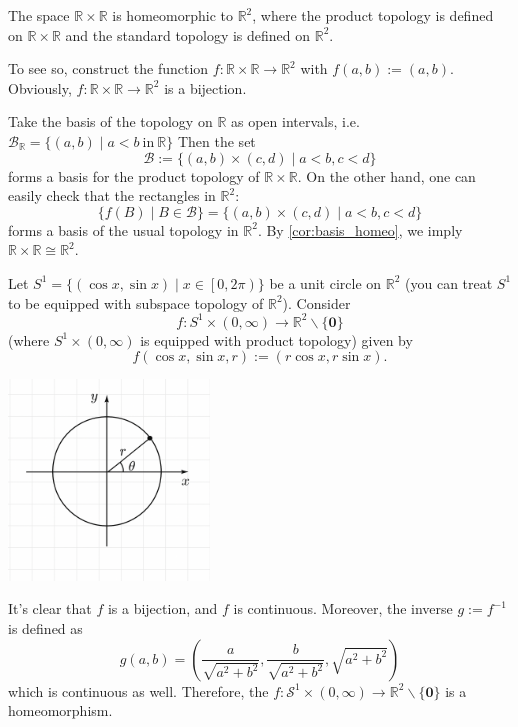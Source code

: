 \begin{example}
The space \(\mathbb{R} \times  \mathbb{R}\) is homeomorphic to \({\mathbb{R}}^{2}\), where the product topology is defined on \(\mathbb{R} \times  \mathbb{R}\) and the standard topology is defined on \({\mathbb{R}}^{2}\). 

To see so, construct the function \(f : \mathbb{R} \times  \mathbb{R} \rightarrow  {\mathbb{R}}^{2}\) with \(f\left({a,b}\right)  :=\left({a,b}\right)\). Obviously, \(f : \mathbb{R} \times  \mathbb{R} \rightarrow  {\mathbb{R}}^{2}\) is a bijection.

Take the basis of the topology on \(\mathbb{R}\) as open intervals, i.e.
\(
\mathcal{B}_{\mathbb{R}} = \{ \left({a,b}\right)  \mid  a < b\ \text{in}\ \mathbb{R}\}
\)
Then the set 
\[\mathcal{B} := \{ \left({a,b}\right)  \times  \left({c,d}\right)  \mid  a < b,c < d\}\] 
forms a basis for the product topology of $\mathbb{R} \times \mathbb{R}$. On the other hand, one can easily check that the rectangles in $\mathbb{R}^2$:
\[
\{ f\left(B\right)  \mid  B \in  \mathcal{B}\}  = \{ \left({a,b}\right)  \times  \left({c,d}\right)  \mid  a < b,c < d\}
\]
forms a basis of the usual topology in \({\mathbb{R}}^{2}\). By \autoref{cor:basis_homeo}, we imply \(\mathbb{R} \times  \mathbb{R} \cong  {\mathbb{R}}^{2}\).
\end{example}


\begin{example} Let \({S}^{1} = \{ (\cos x,\sin x) \mid  x \in  \left\lbrack  {0,{2\pi}}\right) \}\) be a unit circle on \({\mathbb{R}}^{2}\) (you can treat $S^1$ to be equipped with subspace topology of $\mathbb{R}^2$). Consider 
\[f : {S}^{1} \times  \left({0,\infty}\right)  \rightarrow  {\mathbb{R}}^{2} \smallsetminus  \{ \mathbf{0}\}\] 
(where $S^1 \times (0, \infty)$ is equipped with product topology) given by
\[
f\left({\cos x,\sin x,r}\right)  := \left({r\cos x,r\sin x}\right).
\]
\begin{center}
\includegraphics[width=0.4\textwidth]{images/Ch2_polar_coords.png}
\end{center}
It’s clear that \(f\) is a bijection, and \(f\) is continuous. Moreover, the inverse \(g := {f}^{-1}\) is defined as
\[
g\left({a,b}\right)  = \left({\frac{a}{\sqrt{{a}^{2} + {b}^{2}}},\frac{b}{\sqrt{{a}^{2} + {b}^{2}}},\sqrt{{a}^{2} + {b}^{2}}}\right)
\]
which is continuous as well. Therefore, the \(f : {\mathcal{S}}^{1} \times  \left({0,\infty}\right)  \rightarrow  {\mathbb{R}}^{2} \smallsetminus  \{ \mathbf{0}\}\) is a homeomorphism.
\end{example}


